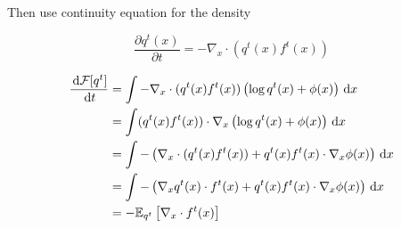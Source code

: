 \documentclass{article}
\begin{document}
Then use continuity equation for the density 

\[
    \frac{\partial q^t(x)}{\partial t}=-\nabla_x\cdot (q^t(x)f^t(x))
\]

\begin{align*}
    \frac{\,\mathrm{d} \mathcal{F}[q^t]}{\,\mathrm{d} t} &= \int -\nabla_x \cdot (q^t(x)f^t(x))\left( \log q^t(x)+\phi(x) \right)\,\mathrm{d} x\\
    &= \int (q^t(x)f^t(x))\cdot \nabla_x\left( \log q^t(x)+\phi(x) \right)\,\mathrm{d} x\\
    &= \int -\left( \nabla_x\cdot (q^t(x)f^t(x))+q^t(x)f^t(x)\cdot \nabla_x\phi(x) \right)\,\mathrm{d} x\\
    &= \int -\left( \nabla_x q^t(x)\cdot f^t(x)+q^t(x)f^t(x)\cdot\nabla_x\phi(x) \right)\,\mathrm{d} x\\
    &= -\mathbb{E}_{q^t}\left[ \nabla_x\cdot f^t(x) \right]
\end{align*}
\end{document}

